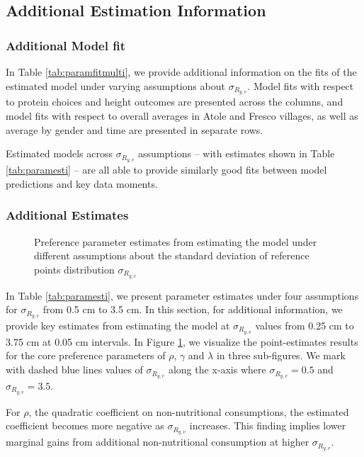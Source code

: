 \subsection{Additional Estimation Information \label{sec:estimorer}}

\subsubsection{Additional Model fit}


In Table \ref{tab:paramfitmulti}, we provide additional information on the fits of the estimated model under varying assumptions about $\sigma_{R_{y,v}}$. Model fits with respect to protein choices and height outcomes are presented across the columns, and model fits with respect to overall averages in Atole and Fresco villages, as well as average by gender and time are presented in separate rows.

Estimated models across $\sigma_{R_{y,v}}$ assumptions -- with estimates shown in Table \ref{tab:paramesti} -- are all able to provide similarly good fits between model predictions and key data moments.

\subsubsection{Additional Estimates}

\begin{figure}[htbp]
\caption{Preference parameter estimates from estimating the model under different assumptions about the standard deviation of reference points distribution $\sigma_{R_{y,v}}$}
\label{fig:estimatesmulti}
\end{figure}

In Table \ref{tab:paramesti}, we present parameter estimates under four assumptions for $\sigma_{R_{y,v}}$ from 0.5 cm to 3.5 cm. In this section, for additional information, we provide key estimates from estimating the model at $\sigma_{R_{y,v}}$ values from 0.25 cm to 3.75 cm at 0.05 cm intervals. In Figure \ref{fig:estimatesmulti}, we visualize the point-estimates results for the core preference parameters of $\rho$, $\gamma$ and $\lambda$ in three sub-figures. We mark with dashed blue lines values of $\sigma_{R_{y,v}}$ along the x-axis where $\sigma_{R_{y,v}}=0.5$ and $\sigma_{R_{y,v}}=3.5$.

For $\rho$, the quadratic coefficient on non-nutritional consumptions, the estimated coefficient becomes more negative as $\sigma_{R_{y,v}}$ increases. This finding implies lower marginal gains from additional non-nutritional consumption at higher $\sigma_{R_{y,v}}$.

\clearpage
\pagebreak